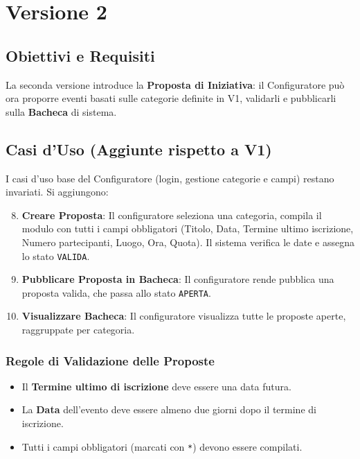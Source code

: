 \chapter{Versione 2}

\section{Obiettivi e Requisiti}
La seconda versione introduce la \textbf{Proposta di Iniziativa}: il Configuratore può ora proporre eventi basati sulle categorie definite in V1, validarli e pubblicarli sulla \textbf{Bacheca} di sistema.

\section{Casi d'Uso (Aggiunte rispetto a V1)}

I casi d'uso base del Configuratore (login, gestione categorie e campi) restano invariati. Si aggiungono:

\begin{enumerate}
    \setcounter{enumi}{7}
    \item \textbf{Creare Proposta}: Il configuratore seleziona una categoria, compila il modulo con tutti i campi obbligatori (Titolo, Data, Termine ultimo iscrizione, Numero partecipanti, Luogo, Ora, Quota). Il sistema verifica le date e assegna lo stato \texttt{VALIDA}.
    \item \textbf{Pubblicare Proposta in Bacheca}: Il configuratore rende pubblica una proposta valida, che passa allo stato \texttt{APERTA}.
    \item \textbf{Visualizzare Bacheca}: Il configuratore visualizza tutte le proposte aperte, raggruppate per categoria.
\end{enumerate}

\subsection{Regole di Validazione delle Proposte}
\begin{itemize}
    \item Il \textbf{Termine ultimo di iscrizione} deve essere una data futura.
    \item La \textbf{Data} dell'evento deve essere almeno due giorni dopo il termine di iscrizione.
    \item Tutti i campi obbligatori (marcati con \texttt{*}) devono essere compilati.
\end{itemize}

